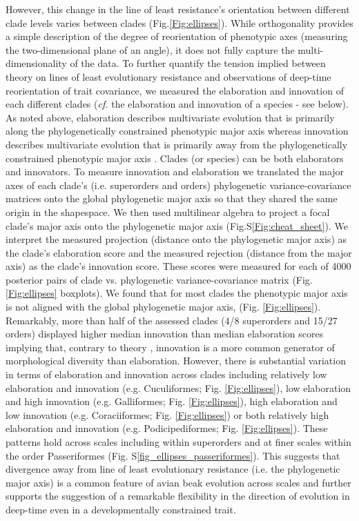 \documentclass[12pt,letterpaper]{article}
\begin{document}
\bigskip

However, this change in the line of least resistance's orientation between different clade levels varies between clades (Fig.\ref{Fig:ellipses}).
While orthogonality provides a simple description of the degree of reorientation of phenotypic axes (measuring the two-dimensional plane of an angle), it does not fully capture the multi-dimensionality of the data.
To further quantify the tension implied between theory on lines of least evolutionary resistance and observations of deep-time reorientation of trait covariance, we measured the elaboration and innovation of each different clades (\textit{cf.} the elaboration and innovation of a species - see below).
As noted above, elaboration describes multivariate evolution that is primarily along the phylogenetically constrained phenotypic major axis whereas innovation describes multivariate evolution that is primarily away from the phylogenetically constrained phenotypic major axis \cite{endler2005animal}.
Clades (or species) can be both elaborators and innovators.
To measure innovation and elaboration we translated the major axes of each clade's (i.e. superorders and orders) phylogenetic variance-covariance matrices onto the global phylogenetic major axis so that they shared the same origin in the shapespace.
We then used multilinear algebra to project a focal clade's major axis onto the phylogenetic major axis (Fig.S\ref{Fig:cheat_sheet}).
We interpret the measured projection (distance onto the phylogenetic major axis) as the clade's elaboration score and the measured rejection (distance from the major axis) as the clade's innovation score.
These scores were measured for each of 4000 posterior pairs of clade vs. phylogenetic variance-covariance matrix (Fig.\ref{Fig:ellipses} boxplots).
We found that for most clades the phenotypic major axis is not aligned with the global phylogenetic major axis, (Fig. \ref{Fig:ellipses}).
Remarkably, more than half of the assessed clades (4/8 superorders and 15/27 orders) displayed higher median innovation than median elaboration scores implying that, contrary to theory \cite{schluter1996adaptive,marroig2005size}, innovation is a more common generator of morphological diversity than elaboration.
However, there is substantial variation in terms of elaboration and innovation across clades including relatively low elaboration and innovation (e.g. Cuculiformes; Fig. \ref{Fig:ellipses}), low elaboration and high innovation (e.g. Galliformes; Fig. \ref{Fig:ellipses}), high elaboration and low innovation (e.g. Coraciiformes; Fig. \ref{Fig:ellipses}) or both relatively high elaboration and innovation (e.g. Podicipediformes; Fig. \ref{Fig:ellipses}).
These patterns hold across scales including within superorders and at finer scales within the order Passeriformes (Fig. S\ref{fig_ellipses_passeriformes}).
This suggests that divergence away from line of least evolutionary resistance (i.e. the phylogenetic major axis) is a common feature of avian beak evolution across scales and further supports the suggestion of a remarkable flexibility in the direction of evolution in deep-time even in a developmentally constrained trait.
\end{document}
